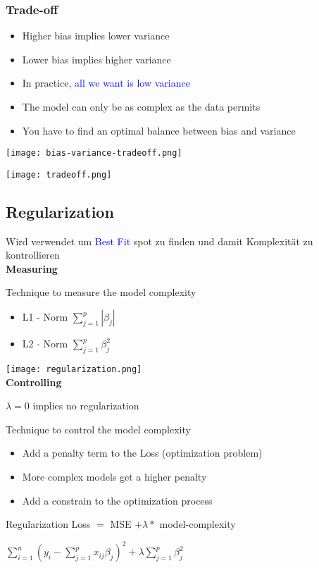 \subsubsection{Trade-off}
\begin{itemize}
    \item Higher bias implies lower variance
    \item Lower bias implies higher variance
    \item In practice, \textcolor{blue}{all we want is low variance}
    \item The model can only be as complex as the data permits
    \item You have to find an optimal balance between bias and variance
\end{itemize}
\texttt{[image: bias-variance-tradeoff.png]}

\texttt{[image: tradeoff.png]}

\subsection{Regularization}
Wird verwendet um \textcolor{blue}{Best Fit} spot zu finden und damit Komplexität zu kontrollieren \\

\textbf{Measuring}

Technique to measure the model complexity
\begin{itemize}
    \item L1 - Norm $\displaystyle\sum_{j = 1}^{p} |\beta_j|$
    \item L2 - Norm $\displaystyle\sum_{j = 1}^{p}\beta_j^2$
\end{itemize}
\vspace{10pt}
\texttt{[image: regularization.png]} \\

\textbf{Controlling}

$\lambda = 0$ implies no regularization

Technique to control the model complexity
\begin{itemize}
    \item Add a penalty term to the Loss (optimization problem)
    \item More complex models get a higher penalty
    \item Add a constrain to the optimization process
\end{itemize}
\vspace{10pt}
Regularization Loss $=$ MSE $+ \lambda *$ model-complexity

\begin{center}
    $\displaystyle\sum_{i = 1}^{n} (y_i - \displaystyle\sum_{j = 1}^{p} x_{ij}\beta_j)^2 + \lambda \displaystyle\sum_{j = 1}^{p}\beta_j^2$
\end{center}
